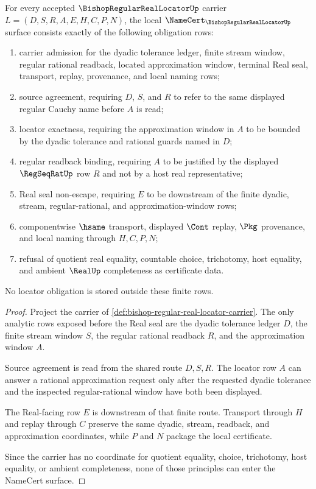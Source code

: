 \begin{theorem}
\label{thm:bishop-regular-real-locator-namecert-obligations}
For every accepted $\BishopRegularRealLocatorUp$ carrier $L=(D,S,R,A,E,H,C,P,N)$, the local $\NameCert_{\BishopRegularRealLocatorUp}$ surface consists exactly of the following obligation rows:
\begin{enumerate}
\item carrier admission for the dyadic tolerance ledger, finite stream window, regular rational readback, located approximation window, terminal Real seal, transport, replay, provenance, and local naming rows;
\item source agreement, requiring $D$, $S$, and $R$ to refer to the same displayed regular Cauchy name before $A$ is read;
\item locator exactness, requiring the approximation window in $A$ to be bounded by the dyadic tolerance and rational guards named in $D$;
\item regular readback binding, requiring $A$ to be justified by the displayed $\RegSeqRatUp$ row $R$ and not by a host real representative;
\item Real seal non-escape, requiring $E$ to be downstream of the finite dyadic, stream, regular-rational, and approximation-window rows;
\item componentwise $\hsame$ transport, displayed $\Cont$ replay, $\Pkg$ provenance, and local naming through $H,C,P,N$;
\item refusal of quotient real equality, countable choice, trichotomy, host equality, and ambient $\RealUp$ completeness as certificate data.
\end{enumerate}
No locator obligation is stored outside these finite rows.
\end{theorem}
\begin{proof}
Project the carrier of \autoref{def:bishop-regular-real-locator-carrier}. The only analytic rows exposed before the Real seal are the dyadic tolerance ledger $D$, the finite stream window $S$, the regular rational readback $R$, and the approximation window $A$.

Source agreement is read from the shared route $D,S,R$. The locator row $A$ can answer a rational approximation request only after the requested dyadic tolerance and the inspected regular-rational window have both been displayed.

The Real-facing row $E$ is downstream of that finite route. Transport through $H$ and replay through $C$ preserve the same dyadic, stream, readback, and approximation coordinates, while $P$ and $N$ package the local certificate.

Since the carrier has no coordinate for quotient equality, choice, trichotomy, host equality, or ambient completeness, none of those principles can enter the NameCert surface.
\end{proof}


